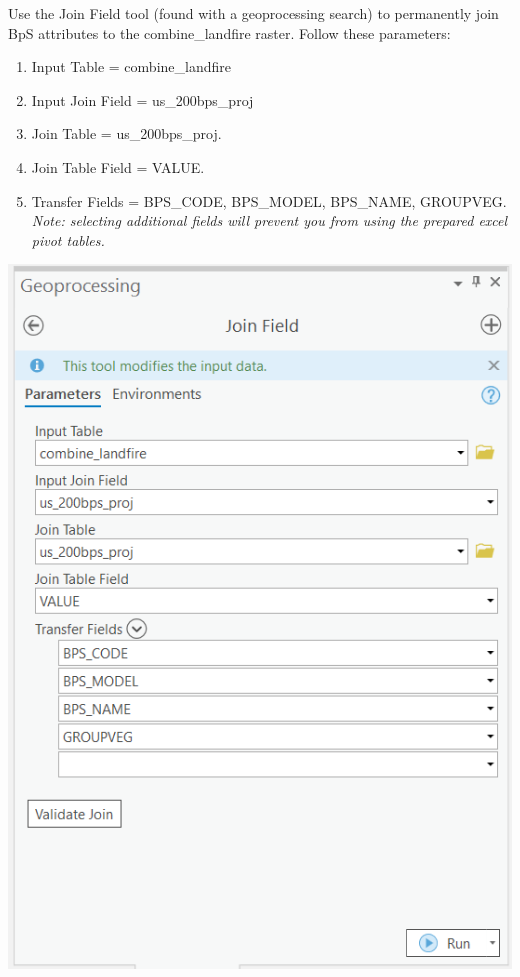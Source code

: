 \documentclass[
]{book}
\providecommand{\tightlist}{%
  \setlength{\itemsep}{0pt}\setlength{\parskip}{0pt}}
\begin{document}
Use the Join Field tool (found with a geoprocessing search) to permanently join BpS attributes to the combine\_landfire raster. Follow these parameters:

\begin{enumerate}
\def\labelenumi{\arabic{enumi}.}
\tightlist
\item
  Input Table = combine\_landfire
\item
  Input Join Field = us\_200bps\_proj
\item
  Join Table = us\_200bps\_proj.
\item
  Join Table Field = VALUE.
\item
  Transfer Fields = BPS\_CODE, BPS\_MODEL, BPS\_NAME, GROUPVEG. \emph{Note: selecting additional fields will prevent you from using the prepared excel pivot tables.}
\end{enumerate}

\includegraphics[width=1000pt]{04_gis_screenshots/8_join_bps}
\end{document}
